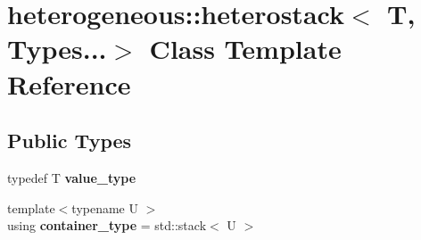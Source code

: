 \hypertarget{classheterogeneous_1_1heterostack_3_01_t_00_01_types_8_8_8_4}{}\section{heterogeneous\+:\+:heterostack$<$ T, Types...$>$ Class Template Reference}
\label{classheterogeneous_1_1heterostack_3_01_t_00_01_types_8_8_8_4}
\subsection*{Public Types}
\begin{DoxyCompactItemize}
\item 
\hypertarget{classheterogeneous_1_1heterostack_3_01_t_00_01_types_8_8_8_4_a0854507cc0769ba75644018d443a5b2c}{}typedef T {\bfseries value\+\_\+type}\label{classheterogeneous_1_1heterostack_3_01_t_00_01_types_8_8_8_4_a0854507cc0769ba75644018d443a5b2c}

\item 
\hypertarget{classheterogeneous_1_1heterostack_3_01_t_00_01_types_8_8_8_4_aac8b0e95efc74066bc8a5ed122161d71}{}{\footnotesize template$<$typename U $>$ }\\using {\bfseries container\+\_\+type} = std\+::stack$<$ U $>$\label{classheterogeneous_1_1heterostack_3_01_t_00_01_types_8_8_8_4_aac8b0e95efc74066bc8a5ed122161d71}

\end{DoxyCompactItemize}
